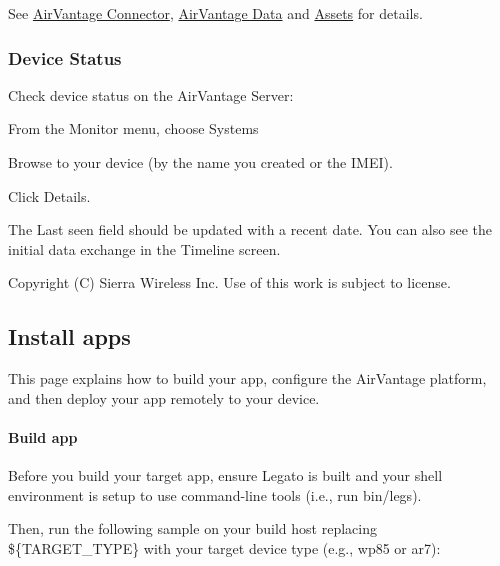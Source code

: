 See \hyperlink{c_le_avc}{Air\+Vantage Connector}, \hyperlink{c_le_avdata}{Air\+Vantage Data} and \hyperlink{def_files_cdef_defFilesCdef_assets}{Assets} for details.\hypertarget{how_to_a_v_connect_connectingAirVantage_checkDeviceStatus}{}\subsubsection{Device Status}\label{how_to_a_v_connect_connectingAirVantage_checkDeviceStatus}
Check device status on the Air\+Vantage Server\+:


\begin{DoxyItemize}
\item From the {\ttfamily Monitor} menu, choose {\ttfamily Systems}
\item Browse to your device (by the name you created or the I\+M\+E\+I).
\item Click Details.
\end{DoxyItemize}

The {\ttfamily Last seen} field should be updated with a recent date. You can also see the initial data exchange in the Timeline screen.





Copyright (C) Sierra Wireless Inc. Use of this work is subject to license. \hypertarget{appInstallAirVantage}{}\subsection{Install apps}\label{appInstallAirVantage}
This page explains how to build your app, configure the Air\+Vantage platform, and then deploy your app remotely to your device.\hypertarget{how_to_a_v_install_app_appInstallAirVantage_buildapp}{}\paragraph{Build app}\label{how_to_a_v_install_app_appInstallAirVantage_buildapp}
Before you build your target app, ensure Legato is built and your shell environment is setup to use command-\/line tools (i.\+e., run {\ttfamily bin/legs}).

Then, run the following sample on your build host replacing {\ttfamily \$\{T\+A\+R\+G\+E\+T\+\_\+\+T\+Y\+P\+E\}} with your target device type (e.\+g., {\ttfamily wp85} or {\ttfamily ar7})\+:



